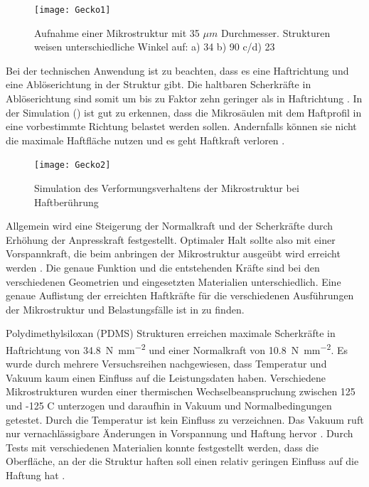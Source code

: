 	\begin{figure}[H]
	\centering
		\texttt{[image: Gecko1]}
	\caption{Aufnahme einer Mikrostruktur mit 35 $\mu m$ Durchmesser. Strukturen weisen unterschiedliche Winkel auf: a) 	34\textdegree{}  b) 90\textdegree{}  c/d) 23\textdegree{} \cite{Schwerter.}}
	\label{fig:Gecko1}
\end{figure}


Bei der technischen Anwendung ist zu beachten, dass es eine Haftrichtung und eine Ablöserichtung in der Struktur gibt. Die haltbaren Scherkräfte in Ablöserichtung sind somit um bis zu Faktor zehn geringer als in Haftrichtung \cite{Schwerter.}.
In der Simulation () ist gut zu erkennen, dass die Mikrosäulen mit dem Haftprofil in eine vorbestimmte Richtung belastet werden sollen. Andernfalls können sie nicht die maximale Haftfläche nutzen und es geht Haftkraft verloren \cite{Schwerter.}. 


\begin{figure}[H]
	\centering
		\texttt{[image: Gecko2]}
	\caption{Simulation des Verformungsverhaltens der Mikrostruktur bei Haftberührung \cite[Abbildung 19, Seite43]{Schwerter.}}
	\label{fig:Gecko2}
\end{figure}	


Allgemein wird eine Steigerung der Normalkraft und der Scherkräfte durch Erhöhung der Anpresskraft festgestellt. Optimaler Halt sollte also mit einer Vorspannkraft, die beim anbringen der Mikrostruktur ausgeübt wird erreicht werden \cite{Schwerter.}. Die genaue Funktion und die entstehenden Kräfte sind bei den verschiedenen Geometrien und eingesetzten Materialien unterschiedlich. Eine genaue Auflistung der erreichten Haftkräfte für die verschiedenen Ausführungen der Mikrostruktur und Belastungsfälle ist in \cite[Tabelle 1]{Schwerter.} zu finden.

Polydimethylsiloxan (PDMS) Strukturen erreichen maximale Scherkräfte in Haftrichtung von \SI{34,8}{\newton\per\square\milli\metre} und einer Normalkraft von \SI{10,8}{\newton\per\square\milli\metre}.
Es wurde durch mehrere Versuchsreihen nachgewiesen, dass Temperatur und Vakuum kaum einen Einfluss auf die Leistungsdaten haben. Verschiedene Mikrostrukturen wurden einer thermischen Wechselbeanspruchung zwischen 125 und -125 \textdegree{} C unterzogen und daraufhin in Vakuum und Normalbedingungen getestet. Durch die Temperatur ist kein Einfluss zu verzeichnen. Das Vakuum ruft nur vernachlässigbare Änderungen in Vorspannung und Haftung hervor \cite[Bild 11]{Trentlage.}. Durch Tests mit verschiedenen Materialien konnte festgestellt werden, dass die Oberfläche, an der die Struktur haften soll einen relativ geringen Einfluss auf die Haftung hat \cite[Bild 16]{Trentlage.}.


